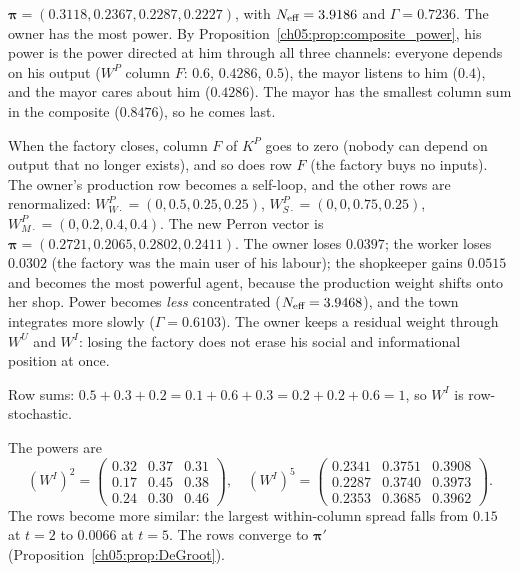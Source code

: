 \documentclass[../solutions_manual.tex]{subfiles}
\begin{document}
 $\boldsymbol\pi = (0.3118, 0.2367, 0.2287, 0.2227)$, with $N_{\text{eff}} = 3.9186$ and $\Gamma = 0.7236$. The owner has the most power. By Proposition~\ref{ch05:prop:composite_power}, his power is the power directed at him through all three channels: everyone depends on his output ($W^P$ column $F$: $0.6$, $0.4286$, $0.5$), the mayor listens to him ($0.4$), and the mayor cares about him ($0.4286$). The mayor has the smallest column sum in the composite ($0.8476$), so he comes last.

 When the factory closes, column $F$ of $K^P$ goes to zero (nobody can depend on output that no longer exists), and so does row $F$ (the factory buys no inputs). The owner's production row becomes a self-loop, and the other rows are renormalized: $W^P_{W\cdot} = (0, 0.5, 0.25, 0.25)$, $W^P_{S\cdot} = (0, 0, 0.75, 0.25)$, $W^P_{M\cdot} = (0, 0.2, 0.4, 0.4)$. The new Perron vector is $\boldsymbol\pi = (0.2721, 0.2065, 0.2802, 0.2411)$. The owner loses $0.0397$; the worker loses $0.0302$ (the factory was the main user of his labour); the shopkeeper gains $0.0515$ and becomes the most powerful agent, because the production weight shifts onto her shop. Power becomes \emph{less} concentrated ($N_{\text{eff}} = 3.9468$), and the town integrates more slowly ($\Gamma = 0.6103$). The owner keeps a residual weight through $W^U$ and $W^I$: losing the factory does not erase his social and informational position at once.


 Row sums: $0.5+0.3+0.2 = 0.1+0.6+0.3 = 0.2+0.2+0.6 = 1$, so $W^I$ is row-stochastic.

 The powers are
\[
(W^I)^2 = \begin{pmatrix} 0.32 & 0.37 & 0.31\\ 0.17 & 0.45 & 0.38\\ 0.24 & 0.30 & 0.46\end{pmatrix},\quad
(W^I)^5 = \begin{pmatrix} 0.2341 & 0.3751 & 0.3908\\ 0.2287 & 0.3740 & 0.3973\\ 0.2353 & 0.3685 & 0.3962\end{pmatrix}.
\]
The rows become more similar: the largest within-column spread falls from $0.15$ at $t = 2$ to $0.0066$ at $t = 5$. The rows converge to $\boldsymbol\pi'$ (Proposition~\ref{ch05:prop:DeGroot}).
\end{document}

